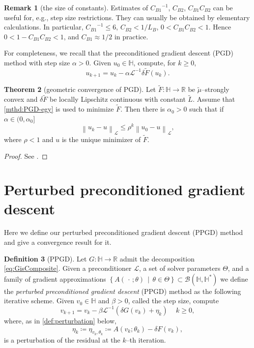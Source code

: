 \documentclass{amsart}
\newcommand{\calB}{{\mathcal{B}}}
\newcommand{\vkp}{{v_{k+1}}}
\newcommand{\vk}{{v_{k}}}
\newcommand{\etak}{{\eta_{k}}}
\newcommand{\dG}{{\delta G}}
\newcommand{\LL}{\mathcal{L}}
\newcommand{\LLinv}{{\mathcal{L}^{-1}}}
\newcommand{\norm}[2]{\left\| #1 \right\| _{#2}}
\newcommand{\HH}{\mathbb{H}}
\newcommand{\RR}{\mathbb{R}}
\newcommand{\s}{{\beta}}	%
\newcommand{\ins}{{\alpha}} %
\newcommand{\CdvB}{{C_{B1}}} %
\newcommand{\CddB}{{C_{B2}}} %
\theoremstyle{definition}
\newtheorem{thm}{Theorem}[section]
\newtheorem{defn}[thm]{Definition}
\newtheorem{rmk}[thm]{Remark}
\begin{document}
\begin{rmk}[the size of constants]
	\label{rmk:CB1CB2}
Estimates of $\CdvB^{-1}$, $\CddB$, $\CdvB \CddB$ can be useful for,  e.g., step size restrictions. They can usually be obtained by elementary calculations. In particular, $\CdvB^{-1}\le 6$, $\CddB < 1/L_B$, $0 < \CdvB \CddB < 1$. Hence $0 < 1 - \CdvB \CddB < 1$, and $\CdvB \approx 1/2$ in practice.
\end{rmk}

For completeness, we recall that the preconditioned gradient descent (PGD) method with step size $\ins>0$. Given $u_0\in\HH$, compute, for $k\ge0$,
\begin{equation}\label{mthd:PGD-egy}
	u_{k+1} = u_k -\ins\LLinv \delta \tilde{F}(u_k).
\end{equation}

	\begin{thm}[geometric convergence of PGD]
	\label{thm:PGD-conv}
Let $\tilde{F}:\HH\to\RR$ be $\tilde{\mu}$--strongly convex and $\delta\tilde{F}$ be locally Lipschitz continuous with constant $\tilde{L}$. Assume that \eqref{mthd:PGD-egy} is used to minimize $\tilde{F}$. Then there is $\ins_0>0$ such that if $\ins \in (0, \ins_0]$
	\begin{equation*}%
\norm{u_k-u}{\LL}\le \rho^k \norm{u_0 - u}{\LL},
	\end{equation*}
where $\rho <1$ and $u$ is the unique minimizer of $\tilde{F}$.
	\end{thm}
	\begin{proof}
See \cite{nesterov2018lectures, feng2017PSD, wise2020FASD}.
	\end{proof}

\section{Perturbed preconditioned gradient descent}\label{sec:PPGD-method}

Here we define our perturbed preconditioned gradient descent (PPGD) method and give a convergence result for it.


	\begin{defn}[PPGD]\label{def:PPGD-mthd}
Let $G:\HH\to\RR$ admit the decomposition \eqref{eq:GisComposite}. Given a preconditioner $\LL$, a set of solver parameters $\Theta$, and a family of gradient approximations $\left\{ A(\, \cdot \, ;\theta) \, \middle| \, \theta \in \Theta\right\} \subset \calB(\HH,\HH^*)$ we define the \emph{perturbed preconditioned gradient descent} (PPGD) method as the following iterative scheme. Given $v_0 \in \HH$ and $\s >0$, called the step size, compute
	\begin{equation}
	\label{mthd:PPGD}
\vkp = \vk - \s\LLinv(\dG(\vk) + \etak) \quad \, k\ge 0,
	\end{equation}
where, as in \eqref{def:perturbation} below,
	\begin{equation}\label{def:perturbation-PPGD}
\eta_k \coloneqq \eta_{v_k,\theta_k}\coloneqq   A(v_k;\theta_k) - \delta F(v_k),
	\end{equation}
is a perturbation of the residual at the $k$--th iteration.
	\end{defn}
	
\end{document}
